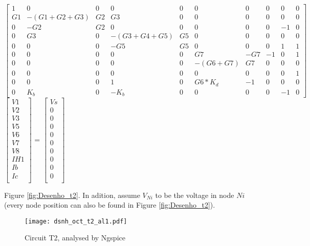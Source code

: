 {\footnotesize

$ \begin{bmatrix}
1 & 0 & 0 & 0 & 0 & 0 & 0 & 0 & 0 & 0 \\
G1 & -(G1+G2+G3) & G2 & G3 & 0 & 0 & 0 & 0 & 0 & 0 \\
0 & -G2 & G2 & 0 & 0 & 0 & 0 & 0 & -1 & 0 \\
0 & G3 & 0 & -(G3+G4+G5) & G5 & 0 & 0 & 0 & 0 & 0 \\
0 & 0 & 0 & -G5 & G5 & 0 & 0 & 0 & 1 & 1 \\
0 & 0 & 0 & 0 & 0 & G7 & -G7 & -1 & 0 & 1 \\
0 & 0 & 0 & 0 & 0 & -(G6+G7) & G7 & 0 & 0 & 0 \\
0 & 0 & 0 & 0 & 0 & 0 & 0 & 0 & 0 & 1 \\
0 & 0 & 0 & 1 & 0 & G6*K_d & -1 & 0 & 0 & 0 \\
0 & K_b & 0 & -K_b & 0 & 0 & 0 & 0 & -1 & 0 
\end{bmatrix}  $
$ \begin{bmatrix}
V1 \\
V2 \\
V3 \\
V5 \\
V6 \\
V7 \\
V8 \\
IH1 \\
Ib \\
Ic \\
\end{bmatrix}  $
=
$ \begin{bmatrix}
Vs\\
0\\
0\\
0\\
0\\
0\\
0\\
0\\
0\\
0\\
\end{bmatrix}  $
}

Figure \ref{fig:Desenho_t2}. In adition, assume $V_{Ni}$ to be the voltage in node $Ni$ (every node position can
also be found in Figure \ref{fig:Desenho_t2}). \\

\begin{figure}[ht]
	\centering
	\texttt{[image: dsnh\_oct\_t2\_al1.pdf]}
	\caption{Circuit T2, analysed by Ngspice}
\label{fig:Dsnh_sim_t2}
\end{figure}






